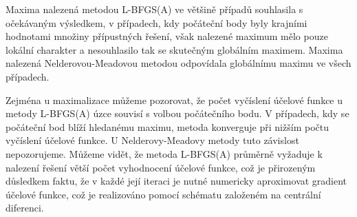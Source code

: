 Maxima nalezená metodou L-BFGS(A) ve většině případů souhlasila s očekávaným výsledkem, v případech, kdy počáteční body byly krajními hodnotami množiny přípustných řešení, však nalezené maximum mělo pouze lokální charakter a nesouhlasilo tak se skutečným globálním maximem. Maxima nalezená Nelderovou-Meadovou metodou odpovídala globálnímu maximu ve všech případech.

Zejména u maximalizace můžeme pozorovat, že počet vyčíslení účelové funkce u metody L-BFGS(A) úzce souvisí s volbou počátečního bodu. V případech, kdy se počáteční bod blíží hledanému maximu, metoda konverguje při nižším počtu vyčíslení účelové funkce. U Nelderovy-Meadovy metody tuto závislost nepozorujeme. Můžeme vidět, že metoda L-BFGS(A) průměrně vyžaduje k nalezení řešení větší počet vyhodnocení účelové funkce, což je přirozeným důsledkem faktu, že v každé její iteraci je nutné numericky aproximovat gradient účelové funkce, což je realizováno pomocí schématu založeném na centrální diferenci.

\newpage

